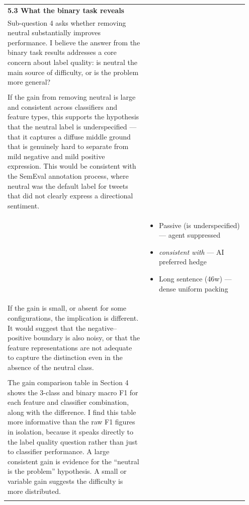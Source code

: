 \documentclass[11pt]{article}
\begin{document}
\begin{longtable}{|p{0.55\linewidth}|p{0.40\linewidth}|}
\hline
\rule[-3.5cm]{0pt}{3.5cm} &  \\
\hline
\textbf{5.3 What the binary task reveals}\\[4pt]
Sub-question 4 asks whether removing neutral substantially improves performance. I believe the answer from the binary task results addresses a core concern about label quality: is neutral the main source of difficulty, or is the problem more general? & \\[2pt]
\hline
\rule[-3.5cm]{0pt}{3.5cm} &  \\
\hline
If the gain from removing neutral is large and consistent across classifiers and feature types, this supports the hypothesis that the neutral label is underspecified --- that it captures a diffuse middle ground that is genuinely hard to separate from mild negative and mild positive expression. This would be consistent with the SemEval annotation process, where neutral was the default label for tweets that did not clearly express a directional sentiment. & \\[2pt]
\hline
\rule[-3.5cm]{0pt}{3.5cm} & \begin{itemize}[leftmargin=1em,itemsep=1pt,topsep=1pt,parsep=0pt]
  \item Passive (is underspecified) --- agent suppressed
  \item \textit{consistent with} --- AI preferred hedge
  \item Long sentence (46w) --- dense uniform packing
\end{itemize} \\
\hline
If the gain is small, or absent for some configurations, the implication is different. It would suggest that the negative--positive boundary is also noisy, or that the feature representations are not adequate to capture the distinction even in the absence of the neutral class. & \\[2pt]
\hline
\rule[-3.5cm]{0pt}{3.5cm} &  \\
\hline
The gain comparison table in Section 4 shows the 3-class and binary macro F1 for each feature and classifier combination, along with the difference. I find this table more informative than the raw F1 figures in isolation, because it speaks directly to the label quality question rather than just to classifier performance. A large consistent gain is evidence for the ``neutral is the problem'' hypothesis. A small or variable gain suggests the difficulty is more distributed. & \\[2pt]
\hline
\rule[-3.5cm]{0pt}{3.5cm} &  \\

\end{longtable}
\end{document}
